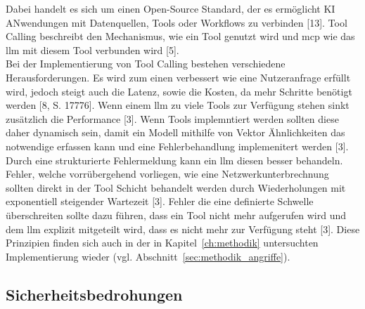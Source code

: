 Dabei handelt es sich um einen Open-Source Standard, der es ermöglicht KI ANwendungen mit Datenquellen, Tools oder Workflows zu verbinden [13]. Tool Calling 
beschreibt den Mechanismus, wie ein Tool genutzt wird und \ac{mcp} wie das \ac{llm} mit diesem Tool verbunden wird [5]. \\
Bei der Implementierung von Tool Calling bestehen verschiedene Herausforderungen. Es wird zum einen verbessert wie eine Nutzeranfrage erfüllt wird, jedoch steigt
auch die Latenz, sowie die Kosten, da mehr Schritte benötigt werden [8, S. 17776]. Wenn einem \ac{llm} zu viele Tools zur Verfügung stehen sinkt zusätzlich die
Performance [3]. Wenn Tools implemntiert werden sollten diese daher dynamisch sein, damit ein Modell mithilfe von Vektor Ähnlichkeiten das notwendige erfassen kann
und eine Fehlerbehandlung implemenitert werden [3]. Durch eine strukturierte Fehlermeldung kann ein \ac{llm} diesen besser behandeln. Fehler, welche vorrübergehend
vorliegen, wie eine Netzwerkunterbrechnung sollten direkt in der Tool Schicht behandelt werden durch Wiederholungen mit exponentiell steigender Wartezeit [3].
Fehler die eine definierte Schwelle überschreiten sollte dazu führen, dass ein Tool nicht mehr aufgerufen wird und dem \ac{llm} explizit mitgeteilt wird, dass 
es nicht mehr zur Verfügung steht [3]. Diese Prinzipien finden sich auch in der in Kapitel~\ref{ch:methodik} untersuchten Implementierung wieder 
(vgl. Abschnitt~\ref{sec:methodik_angriffe}).

\subsection{Sicherheitsbedrohungen}\label{subsec:sicherheitsbedrohungen}

